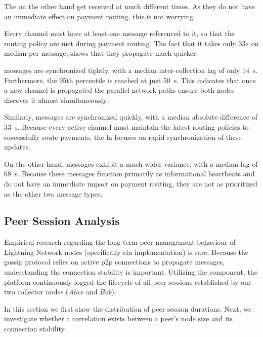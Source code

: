 The  on the other hand get received at much different times.
As they do not have an immediate effect on payment routing, this is not worrying.

Every channel must have at least one  message referenced to it,
so that the routing policy are met during payment routing.
The fact that it takes only $33 s$ on median per  message,
shows that they propagate much quicker.

 messages are synchronized tightly, 
with a median inter-collection lag of only \qty{14}{\second}. 
Furthermore, the \num{95}th percentile is reached at just \qty{50}{\second}. 
This indicates that once a new channel is propagated the parallel network paths ensure 
both nodes discover it almost simultaneously.

Similarly,  messages are synchronized quickly, 
with a median absolute difference of \qty{33}{\second}. 
Because every active channel must maintain the latest routing policies to successfully route payments, 
the \gls{ln} focuses on rapid synchronization of these updates. 

On the other hand,  messages exhibit a much wider variance, 
with a median lag of \qty{68}{\second}. 
Because these messages function primarily as informational heartbeats and do not have an immediate impact on payment routing, 
they are not as prioritized as the other two message types.


\subsection{Peer Session Analysis}
\label{sec:peer-session}

Empirical research regarding the long-term peer management behaviour of Lightning Network nodes (specifically \gls{cln} implementation) is rare.
Because the gossip protocol relies on active \gls{p2p} connections to propagate messages, understanding the connection stability is important. 
Utilizing the  component, the  platform continuously logged the lifecycle of all peer sessions established by 
our two collector nodes (\textit{Alice} and \textit{Bob}).

In this section we first show the distribution of peer session durations.
Next, we investigate whether a correlation exists between a peer's node size and its connection stability.


